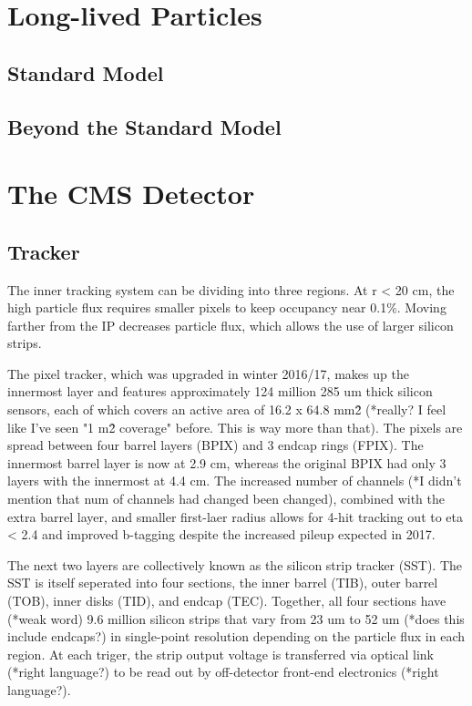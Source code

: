 \documentclass[12pt]{article}
\begin{document}
\section{Long-lived Particles}
\subsection{Standard Model}
\subsection{Beyond the Standard Model}

\section{The CMS Detector}
\subsection{Tracker}
        The inner tracking system can be dividing into three regions. At r < 20 cm, the high particle flux requires smaller pixels to keep occupancy near 0.1\%. Moving farther from the IP decreases particle flux, which allows the use of larger silicon strips.

        The pixel tracker, which was upgraded in winter 2016/17, makes up the innermost layer and features approximately 124 million 285 um thick silicon sensors, each of which covers an active area of 16.2 x 64.8 mm\^2 (*really? I feel like I've seen "1 m\^2 coverage" before. This is way more than that). The pixels are spread between four barrel layers (BPIX) and 3 endcap rings (FPIX). The innermost barrel layer is now at 2.9 cm, whereas the original BPIX had only 3 layers with the innermost at 4.4 cm. The increased number of channels (*I didn't mention that num of channels had changed been changed), combined with the extra barrel layer, and smaller first-laer radius allows for 4-hit tracking out to eta < 2.4 and improved b-tagging despite the increased pileup expected in 2017.

        The next two layers are collectively known as the silicon strip tracker (SST). The SST is itself seperated into four sections, the inner barrel (TIB), outer barrel (TOB), inner disks (TID), and endcap (TEC). Together, all four sections have (*weak word) 9.6 million silicon strips that vary from 23 um to 52 um (*does this include endcaps?) in single-point resolution depending on the particle flux in each region. At each triger, the strip output voltage is transferred via optical link (*right language?) to be read out by off-detector front-end electronics (*right language?).
\end{document}
